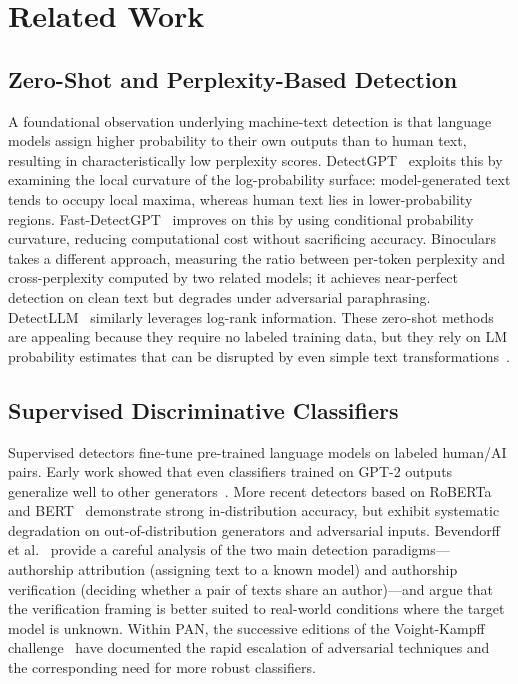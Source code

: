 
\section{Related Work}
\label{sec:relatedwork}

\subsection{Zero-Shot and Perplexity-Based Detection}

A foundational observation underlying machine-text detection is that language models assign higher probability to their own outputs than to human text, resulting in characteristically low perplexity scores. DetectGPT~\cite{mitchell:2023} exploits this by examining the local curvature of the log-probability surface: model-generated text tends to occupy local maxima, whereas human text lies in lower-probability regions. Fast-DetectGPT~\cite{bao:2023} improves on this by using conditional probability curvature, reducing computational cost without sacrificing accuracy. Binoculars~\cite{hans:2024} takes a different approach, measuring the ratio between per-token perplexity and cross-perplexity computed by two related models; it achieves near-perfect detection on clean text but degrades under adversarial paraphrasing. DetectLLM~\cite{su:2023} similarly leverages log-rank information. These zero-shot methods are appealing because they require no labeled training data, but they rely on LM probability estimates that can be disrupted by even simple text transformations~\cite{sadasivan:2023}.

\subsection{Supervised Discriminative Classifiers}

Supervised detectors fine-tune pre-trained language models on labeled human/AI pairs. Early work showed that even classifiers trained on GPT-2 outputs generalize well to other generators~\cite{solaiman:2019,ippolito:2020}. More recent detectors based on RoBERTa~\cite{liu:2019} and BERT~\cite{devlin:2019} demonstrate strong in-distribution accuracy, but exhibit systematic degradation on out-of-distribution generators and adversarial inputs. Bevendorff et al.~\cite{bevendorff:2025b} provide a careful analysis of the two main detection paradigms—authorship attribution (assigning text to a known model) and authorship verification (deciding whether a pair of texts share an author)—and argue that the verification framing is better suited to real-world conditions where the target model is unknown. Within PAN, the successive editions of the Voight-Kampff challenge~\cite{bevendorff:2024d,bevendorff:2025d} have documented the rapid escalation of adversarial techniques and the corresponding need for more robust classifiers.

